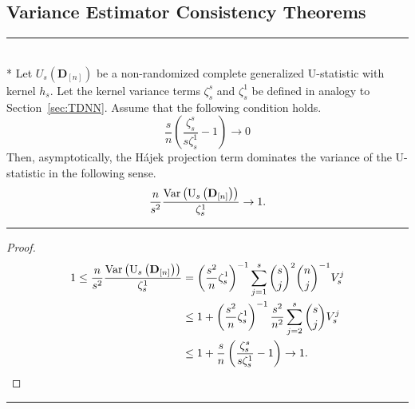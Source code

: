 \subsection{Variance Estimator Consistency Theorems}
\hrule

\begin{lem}\label{lem:Hajek_Dominance}\mbox{}\\*
	Let $U_{s}\left(\mathbf{D}_{[n]}\right)$ be a non-randomized complete generalized U-statistic with kernel $h_s$.
	Let the kernel variance terms $\zeta_{s}^{s}$ and $\zeta_{s}^{1}$ be defined in analogy to Section~\ref{sec:TDNN}.
	Assume that the following condition holds.
	\begin{equation}
		\frac{s}{n}\left(\frac{\zeta_{s}^{s}}{s \zeta_{s}^{1}} - 1\right) \rightarrow 0
	\end{equation}
	Then, asymptotically, the H\'ajek projection term dominates the variance of the U-statistic in the following sense.
	\begin{equation}
		\frac{n}{s^2}\frac{\text{Var}\left(\mathrm{U}_{s}\left(\mathbf{D}_{[n]}\right)\right)}{\zeta_{s}^{1}}
		\rightarrow 1.
	\end{equation}
\end{lem}
\hrule
\begin{proof}
	\begin{equation}
		\begin{aligned}
			1 \leq \frac{n}{s^2}\frac{\text{Var}\left(\mathrm{U}_{s}\left(\mathbf{D}_{[n]}\right)\right)}{\zeta_{s}^{1}}
			 & = \left(\frac{s^2}{n} \zeta_{s}^{1}\right)^{-1} \sum_{j=1}^{s}\binom{s}{j}^2\binom{n}{j}^{-1} V_{s}^{j}     \\
			 & \leq 1 + \left(\frac{s^2}{n} \zeta_{s}^{1}\right)^{-1} \frac{s^2}{n^2} \sum_{j=2}^{s}\binom{s}{j} V_{s}^{j} \\
			 & \leq 1 + \frac{s}{n}\left(\frac{\zeta_{s}^{s}}{s\zeta_{s}^{1}} - 1\right)
			\rightarrow 1.
		\end{aligned}
	\end{equation}
\end{proof}

\hrule

